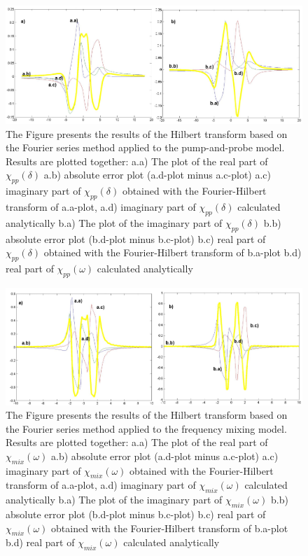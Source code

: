 \documentclass[12pt,twoside,a4paper]{article}
\numberwithin{equation}{subsection}
\numberwithin{figure}{subsection}
\begin{document}
\begin{figure} 
  \includegraphics[width=150mm]{img/four_pnp.png}
  \caption{The Figure presents the results of the Hilbert transform based on the Fourier series method applied to the pump-and-probe model.
  Results are plotted together:
     a.a) The plot of the real part of ${\chi_{pp}}(\delta )$
     a.b) absolute error plot (a.d-plot minus a.c-plot)
     a.c) imaginary part of ${\chi_{pp}}(\delta )$ obtained with the Fourier-Hilbert transform of a.a-plot, 
     a.d) imaginary part of ${\chi_{pp}}(\delta )$ calculated analytically 
     b.a) The plot of the imaginary part of ${\chi_{pp}}(\delta )$ 
     b.b) absolute error plot (b.d-plot minus b.c-plot)
     b.c) real part of ${\chi_{pp}}(\delta )$ obtained with the Fourier-Hilbert transform of b.a-plot 
     b.d) real part of $\chi_{pp} (\omega )$ calculated analytically 
     \label{fig:four_pnp}
     }
\end{figure} 

\begin{figure} 
  \includegraphics[width=150mm]{img/four_fmix.png}
  \caption{ The Figure presents the results of the Hilbert transform based on the Fourier series method applied to the frequency mixing
  model. Results are plotted together:
     a.a) The plot of the real part of ${\chi_{mix}}(\omega )$
     a.b) absolute error plot (a.d-plot minus a.c-plot)
     a.c) imaginary part of ${\chi_{mix}}(\omega )$ obtained with the Fourier-Hilbert transform of a.a-plot, 
     a.d) imaginary part of ${\chi_{mix}}(\omega )$ calculated analytically 
     b.a) The plot of the imaginary part of ${\chi_{mix}}(\omega )$ 
     b.b) absolute error plot (b.d-plot minus b.c-plot)
     b.c) real part of ${\chi_{mix}}(\omega )$ obtained with the Fourier-Hilbert transform of b.a-plot  
     b.d) real part of $\chi_{mix} (\omega )$ calculated analytically 
     \label{fig:four_fmix}
     }
\end{figure}
\end{document}
